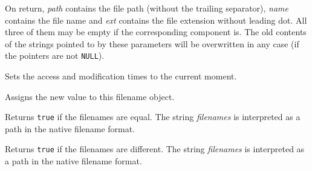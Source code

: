 On return, {\it path} contains the file path (without the trailing separator), 
{\it name} contains the file name and {\it ext} contains the file extension
without leading dot. All three of them may be empty if the corresponding
component is. The old contents of the strings pointed to by these parameters
will be overwritten in any case (if the pointers are not {\tt NULL}).

\label{wxfilenametouch}


Sets the access and modification times to the current moment.

\label{wxfilenameoperatorassign}



Assigns the new value to this filename object.

\label{wxfilenameoperatorequal}



Returns {\tt true} if the filenames are equal. The string {\it filenames} is
interpreted as a path in the native filename format.

\label{wxfilenameoperatornotequal}



Returns {\tt true} if the filenames are different. The string {\it filenames}
is interpreted as a path in the native filename format.

